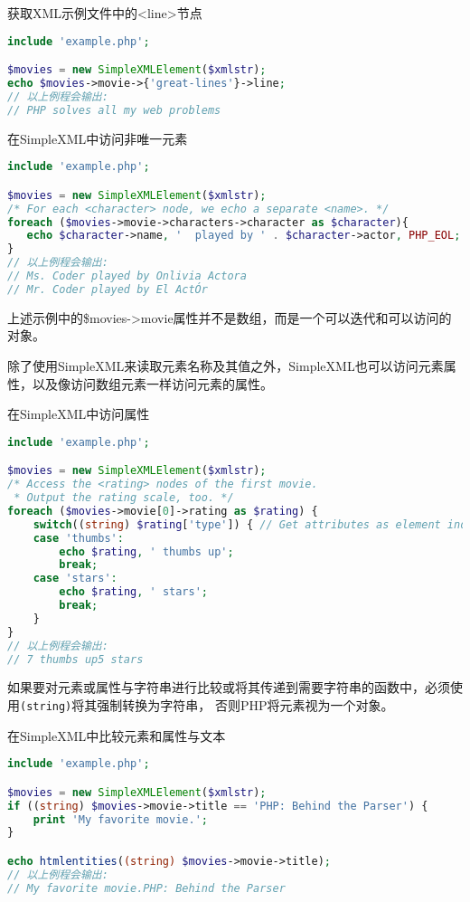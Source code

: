 \begin{example}
获取XML示例文件中的<line>节点
\begin{lstlisting}[language=PHP]
include 'example.php';

$movies = new SimpleXMLElement($xmlstr);
echo $movies->movie->{'great-lines'}->line;
// 以上例程会输出:
// PHP solves all my web problems
\end{lstlisting}
\end{example}

\begin{example}
在SimpleXML中访问非唯一元素
\begin{lstlisting}[language=PHP]
include 'example.php';

$movies = new SimpleXMLElement($xmlstr);
/* For each <character> node, we echo a separate <name>. */
foreach ($movies->movie->characters->character as $character){
   echo $character->name, '  played by ' . $character->actor, PHP_EOL;
}
// 以上例程会输出:
// Ms. Coder played by Onlivia Actora
// Mr. Coder played by El ActÓr
\end{lstlisting}
\end{example}

上述示例中的\$movies->movie属性并不是数组，而是一个可以迭代和可以访问的对象。

除了使用SimpleXML来读取元素名称及其值之外，SimpleXML也可以访问元素属性，以及像访问数组元素一样访问元素的属性。

\begin{example}
在SimpleXML中访问属性
\begin{lstlisting}[language=PHP]
include 'example.php';

$movies = new SimpleXMLElement($xmlstr);
/* Access the <rating> nodes of the first movie.
 * Output the rating scale, too. */
foreach ($movies->movie[0]->rating as $rating) {
    switch((string) $rating['type']) { // Get attributes as element indices
    case 'thumbs':
        echo $rating, ' thumbs up';
        break;
    case 'stars':
        echo $rating, ' stars';
        break;
    }
}
// 以上例程会输出:
// 7 thumbs up5 stars
\end{lstlisting}
\end{example}


如果要对元素或属性与字符串进行比较或将其传递到需要字符串的函数中，必须使用\texttt{(string)}将其强制转换为字符串， 否则PHP将元素视为一个对象。

\begin{example}
在SimpleXML中比较元素和属性与文本
\begin{lstlisting}[language=PHP]
include 'example.php';

$movies = new SimpleXMLElement($xmlstr);
if ((string) $movies->movie->title == 'PHP: Behind the Parser') {
    print 'My favorite movie.';
}

echo htmlentities((string) $movies->movie->title);
// 以上例程会输出:
// My favorite movie.PHP: Behind the Parser
\end{lstlisting}
\end{example}



